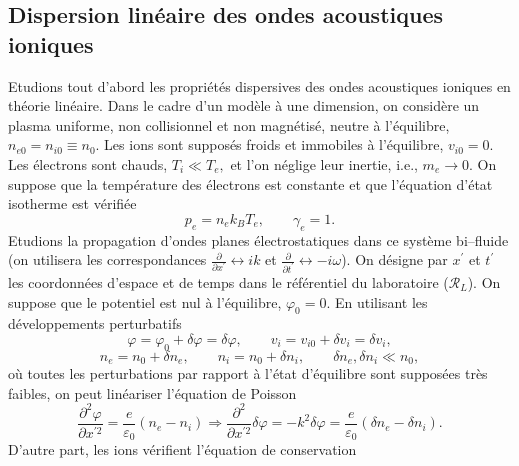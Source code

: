 \documentclass[10pt,thmsa]{article}
\begin{document}
\subsection{Dispersion lin\'{e}aire des ondes acoustiques ioniques}

Etudions tout d'abord les propri\'{e}t\'{e}s dispersives des ondes acoustiques
ioniques en th\'{e}orie lin\'{e}aire. Dans le cadre d'un mod\`{e}le \`{a} une
dimension, on consid\`{e}re un plasma uniforme, non collisionnel et non
magn\'{e}tis\'{e}, neutre \`{a} l'\'{e}quilibre, $n_{e0}=n_{i0}\equiv n_{0}$.
Les ions sont suppos\'{e}s froids et immobiles \`{a} l'\'{e}quilibre,
$v_{i0}=0.$ Les \'{e}lectrons sont chauds, $T_{i}\ll T_{e},$ et l'on
n\'{e}glige leur inertie, i.e., $m_{e}\longrightarrow0.$ On suppose que la
temp\'{e}rature des \'{e}lectrons est constante et que l'\'{e}quation
d'\'{e}tat isotherme est v\'{e}rifi\'{e}e
\begin{equation}
p_{e}=n_{e}k_{B}T_{e},\qquad\gamma_{e}=1.\label{A13}%
\end{equation}
Etudions la propagation d'ondes planes \'{e}lectrostatiques dans ce
syst\`{e}me bi--fluide (on utilisera les correspondances $\frac{\partial
}{\partial x^{\prime}}\leftrightarrow ik$ et $\frac{\partial}{\partial
t^{\prime}}\leftrightarrow-i\omega$). On d\'{e}signe par $x^{\prime}$ et
$t^{\prime} $ les coordonn\'{e}es d'espace et de temps dans le
r\'{e}f\'{e}rentiel du laboratoire ($\mathcal{R}_{L}$). On suppose que le
potentiel est nul \`{a} l'\'{e}quilibre, $\varphi_{0}=0$. En utilisant les
d\'{e}veloppements perturbatifs
\begin{equation}
\varphi=\varphi_{0}+\delta\varphi=\delta\varphi,\qquad v_{i}=v_{i0}+\delta
v_{i}=\delta v_{i},\label{A15}%
\end{equation}%
\begin{equation}
n_{e}=n_{0}+\delta n_{e},\qquad n_{i}=n_{0}+\delta n_{i},\qquad\delta
n_{e},\delta n_{i}\ll n_{0},\label{A14}%
\end{equation}
o\`{u} toutes les perturbations par rapport \`{a} l'\'{e}tat d'\'{e}quilibre
sont suppos\'{e}es tr\`{e}s faibles, on peut lin\'{e}ariser l'\'{e}quation de
Poisson
\begin{equation}
\frac{\partial^{2}\varphi}{\partial x^{\prime2}}=\frac{e}{\varepsilon_{0}%
}(n_{e}-n_{i})\Rightarrow\frac{\partial^{2}}{\partial x^{\prime2}}%
\delta\varphi=-k^{2}\delta\varphi=\frac{e}{\varepsilon_{0}}(\delta
n_{e}-\delta n_{i}).\label{A16}%
\end{equation}
D'autre part, les ions v\'{e}rifient l'\'{e}quation de conservation
\end{document}
